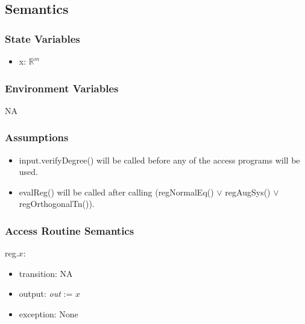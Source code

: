 \documentclass[12pt, titlepage]{article}
\begin{document}
\subsection{Semantics}

\subsubsection{State Variables}
\begin{itemize}

\item x: $\mathbb{R}^m$\\
\end{itemize}



\subsubsection{Environment Variables}

NA

\subsubsection{Assumptions}
\begin{itemize}
\item input.verifyDegree() will be called before any of the access programs 
will be used.
\item evalReg() will be called after calling (regNormalEq() $\lor$  
regAugSys() $\lor$ regOrthogonalTn()).
\end{itemize}
\subsubsection{Access Routine Semantics}

\noindent reg.$x$:
\begin{itemize}
	\item transition: NA	
	\item output: \textit{out} := $x$
	\item exception: None
\end{itemize}
\end{document}
